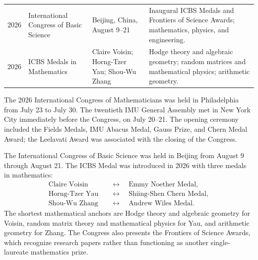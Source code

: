 {\begin{longtable}{@{}L{0.08\textwidth}L{0.25\textwidth}L{0.27\textwidth}L{0.32\textwidth}@{}}
        2026
        & International Congress of Basic Science
        & Beijing, China, August 9--21
        & Inaugural ICBS Medals and Frontiers of Science Awards; mathematics,
          physics, and engineering. \\

        2026
        & ICBS Medals in Mathematics
        & Claire Voisin; Horng-Tzer Yau; Shou-Wu Zhang
        & Hodge theory and algebraic geometry; random matrices and mathematical
          physics; arithmetic geometry. \\
    \end{longtable}
    }

    \begin{fact}[2026 ICM]
        The 2026 International Congress of Mathematicians was held in
        Philadelphia from July 23 to July 30. The twentieth IMU General Assembly
        met in New York City immediately before the Congress, on July 20--21.
        The opening ceremony included the Fields Medals, IMU Abacus Medal, Gauss
        Prize, and Chern Medal Award; the Leelavati Award was associated with the
        closing of the Congress.
    \end{fact}

    \begin{fact}
        The International Congress of Basic Science was held in Beijing from
        August 9 through August 21. The ICBS Medal was introduced
        in 2026 with three medals in mathematics:
        \[
            \begin{aligned}
                \text{Claire Voisin}
                &\quad\longleftrightarrow\quad
                \text{Emmy Noether Medal},\\
                \text{Horng-Tzer Yau}
                &\quad\longleftrightarrow\quad
                \text{Shiing-Shen Chern Medal},\\
                \text{Shou-Wu Zhang}
                &\quad\longleftrightarrow\quad
                \text{Andrew Wiles Medal}.
            \end{aligned}
        \]
        The shortest mathematical anchors are Hodge theory and algebraic
        geometry for Voisin, random matrix theory and mathematical physics for
        Yau, and arithmetic geometry for Zhang. The Congress also presents the
        Frontiers of Science Awards, which recognize research papers rather than
        functioning as another single-laureate mathematics prize.
    \end{fact}


